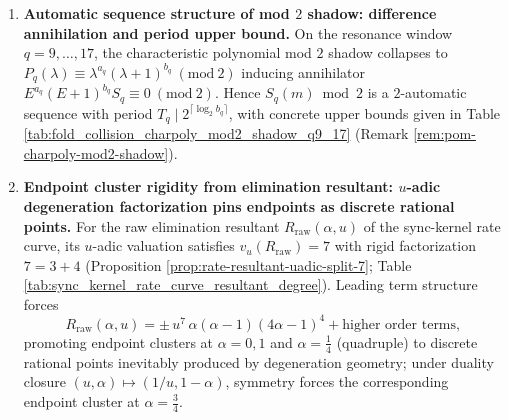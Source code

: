 \begin{enumerate}
  \item \textbf{Automatic sequence structure of mod \(2\) shadow: difference annihilation and period upper bound.}
  On the resonance window \(q=9,\dots,17\), the characteristic polynomial mod \(2\) shadow collapses to
  \(
  P_q(\lambda)\equiv \lambda^{a_q}(\lambda+1)^{b_q}\ (\mathrm{mod}\ 2)
  \)
  inducing annihilator \(E^{a_q}(E+1)^{b_q}S_q\equiv 0\ (\mathrm{mod}\ 2)\).
  Hence \(S_q(m)\bmod 2\) is a \(2\)-automatic sequence with period \(T_q\mid 2^{\lceil\log_2 b_q\rceil}\), with concrete upper bounds given in Table \ref{tab:fold_collision_charpoly_mod2_shadow_q9_17} (Remark \ref{rem:pom-charpoly-mod2-shadow}).

  \item \textbf{Endpoint cluster rigidity from elimination resultant: \texorpdfstring{$u$}{u}-adic degeneration factorization pins endpoints as discrete rational points.}
  For the raw elimination resultant \(R_{\mathrm{raw}}(\alpha,u)\) of the sync-kernel rate curve, its \(u\)-adic valuation satisfies \(v_u(R_{\mathrm{raw}})=7\) with rigid factorization \(7=3+4\) (Proposition \ref{prop:rate-resultant-uadic-split-7}; Table \ref{tab:sync_kernel_rate_curve_resultant_degree}).
  Leading term structure forces
  \[
  R_{\mathrm{raw}}(\alpha,u)=\pm\,u^7\,\alpha(\alpha-1)(4\alpha-1)^4+\text{higher order terms},
  \]
  promoting endpoint clusters at \(\alpha=0,1\) and \(\alpha=\tfrac14\) (quadruple) to discrete rational points inevitably produced by degeneration geometry; under duality closure \((u,\alpha)\mapsto(1/u,1-\alpha)\), symmetry forces the corresponding endpoint cluster at \(\alpha=\tfrac34\).
\end{enumerate}

